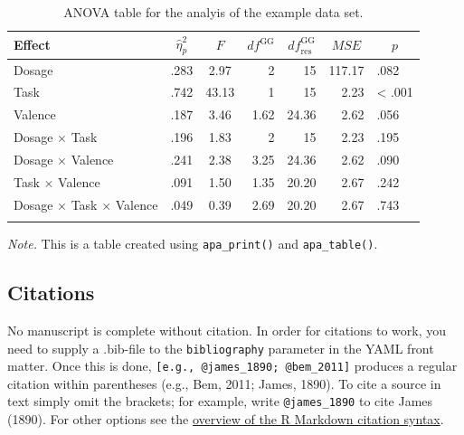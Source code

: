 \documentclass[
  man,floatsintext]{apa6}
\begin{document}
\begin{table}[tbp]

\begin{center}
\begin{threeparttable}

\caption{\label{tab:anova}ANOVA table for the analyis of the example data set.}

\begin{tabular}{lrcrrrl}
\toprule
Effect & \multicolumn{1}{c}{$\hat{\eta}^2_p$} & \multicolumn{1}{c}{$F$} & \multicolumn{1}{c}{$\mathit{df}^{\mathrm{GG}}$} & \multicolumn{1}{c}{$\mathit{df}_{\mathrm{res}}^{\mathrm{GG}}$} & \multicolumn{1}{c}{$\mathit{MSE}$} & \multicolumn{1}{c}{$p$}\\
\midrule
Dosage & .283 & 2.97 & 2 & 15 & 117.17 & .082\\
Task & .742 & 43.13 & 1 & 15 & 2.23 & < .001\\
Valence & .187 & 3.46 & 1.62 & 24.36 & 2.62 & .056\\
Dosage $\times$ Task & .196 & 1.83 & 2 & 15 & 2.23 & .195\\
Dosage $\times$ Valence & .241 & 2.38 & 3.25 & 24.36 & 2.62 & .090\\
Task $\times$ Valence & .091 & 1.50 & 1.35 & 20.20 & 2.67 & .242\\
Dosage $\times$ Task $\times$ Valence & .049 & 0.39 & 2.69 & 20.20 & 2.67 & .743\\
\bottomrule
\addlinespace
\end{tabular}

\begin{tablenotes}[para]
\normalsize{\textit{Note.} This is a table created using \texttt{apa\_print()} and \texttt{apa\_table()}.}
\end{tablenotes}

\end{threeparttable}
\end{center}

\end{table}

\hypertarget{citations}{%
\subsection{Citations}\label{citations}}

No manuscript is complete without citation.
In order for citations to work, you need to supply a .bib-file to the \texttt{bibliography} parameter in the YAML front matter.
Once this is done, \texttt{{[}e.g.,\ @james\_1890;\ @bem\_2011{]}} produces a regular citation within parentheses (e.g., Bem, 2011; James, 1890).
To cite a source in text simply omit the brackets; for example, write \texttt{@james\_1890} to cite James (1890).
For other options see the \href{https://rmarkdown.rstudio.com/authoring_bibliographies_and_citations.html}{overview of the R Markdown citation syntax}.
\end{document}
